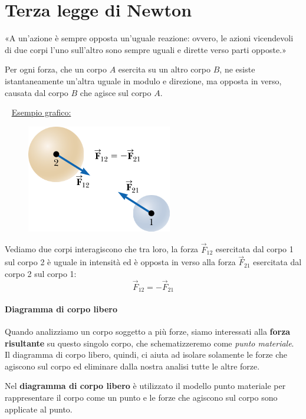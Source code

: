 \documentclass[a4paper,11pt,oneside]{book}
\begin{document}
\section{Terza legge di Newton}
«A un'azione è sempre opposta un'uguale reazione: ovvero, le azioni vicendevoli di due corpi l'uno sull'altro sono sempre uguali e dirette verso parti opposte.»

\begin{displayquote}
    \centering
    Per ogni forza, che un corpo $A$ esercita su un altro corpo $B$, ne esiste istantaneamente un'altra
    uguale in modulo e direzione, ma opposta in verso, causata dal corpo $B$ che agisce sul corpo $A$.
\end{displayquote}

~\newline
\underline{Esempio grafico:}

\begin{figure}[h]
    \centering
    \includegraphics[scale=0.4]{terza_legge_newton}
\end{figure}
\noindent Vediamo due corpi interagiscono che tra loro, la forza $\vec{F}_{12}$ esercitata dal corpo 1 sul corpo 2 è uguale in intensità ed è opposta
in verso alla forza $\vec{F}_{21}$ esercitata dal corpo 2 sul corpo 1:
\begin{equation*}
    \vec{F}_{12} = -\vec{F}_{21}
\end{equation*}

\paragraph{Diagramma di corpo libero}  Quando analizziamo un corpo soggetto a più forze, siamo interessati alla \textbf{forza risultante} 
su questo singolo corpo, che schematizzeremo come \emph{punto materiale}. Il diagramma di corpo libero, quindi, ci aiuta ad isolare solamente le forze che 
agiscono sul corpo ed eliminare dalla nostra analisi tutte le altre forze.

Nel \textbf{diagramma di corpo libero} è utilizzato il modello punto materiale per rappresentare il corpo come un punto e le forze che agiscono sul corpo sono applicate al punto.
\end{document}
